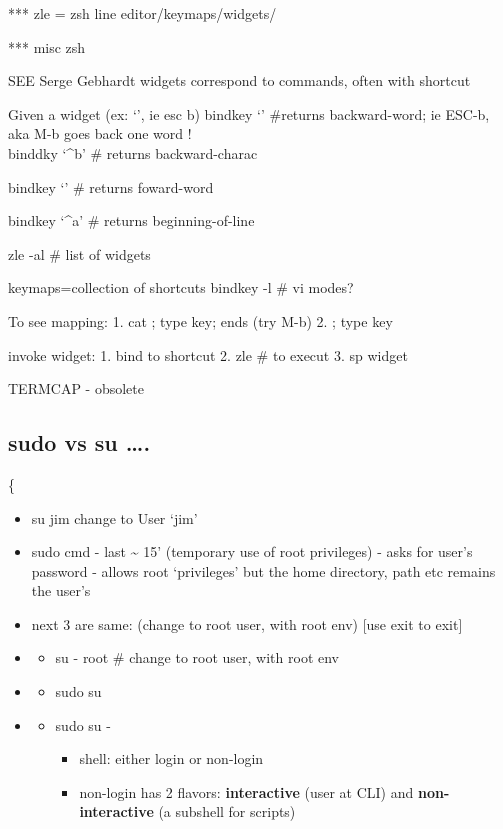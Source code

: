 \documentclass[
]{report}
\providecommand{\tightlist}{%
  \setlength{\itemsep}{0pt}\setlength{\parskip}{0pt}}\usepackage{longtable,booktabs,array}
\begin{document}
*** zle = zsh line editor/keymaps/widgets/

*** misc zsh

SEE Serge Gebhardt widgets correspond to commands, often with shortcut

Given a widget (ex: `\eb', ie esc b) bindkey `\eb' \#returns
backward-word; ie ESC-b, aka M-b goes back one word !\\
binddky `\^{}b' \# returns backward-charac

bindkey `\ef' \# returns foward-word

bindkey `\^{}a' \# returns beginning-of-line

zle -al \# list of widgets

keymaps=collection of shortcuts bindkey -l \# vi modes?

To see mapping: 1. cat ; type key; ends (try M-b) 2. ; type key

invoke widget: 1. bind to shortcut 2. zle \# to execut 3. sp widget

TERMCAP - obsolete

\subsection{sudo vs su \ldots.}\label{sudo-vs-su-.}

\{

\begin{itemize}
\item
  su jim change to User `jim'
\item
  sudo cmd - last \textasciitilde{} 15' (temporary use of root
  privileges) - asks for user's password - allows root `privileges' but
  the home directory, path etc remains the user's
\item
  next 3 are same: (change to root user, with root env) {[}use exit to
  exit{]}
\item
  \begin{itemize}
  \tightlist
  \item
    su - root \# change to root user, with root env
  \end{itemize}
\item
  \begin{itemize}
  \tightlist
  \item
    sudo su
  \end{itemize}
\item
  \begin{itemize}
  \item
    sudo su -

    \begin{itemize}
    \tightlist
    \item
      shell: either login or non-login
    \item
      non-login has 2 flavors: \textbf{interactive} (user at CLI) and
      \textbf{non-interactive} (a subshell for scripts)
    \end{itemize}
  \end{itemize}
\end{itemize}
\end{document}
